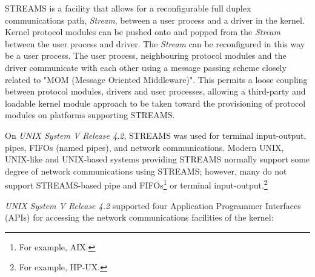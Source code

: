 \documentclass[letterpaper,final,notitlepage,twocolumn,10pt,twoside]{article}
\begin{document}
STREAMS is a facility that allows for a reconfigurable full duplex
communications path, \textit{Stream}, between a user process and a driver in
the kernel.   Kernel protocol modules can be pushed onto and popped from the
\textit{Stream} between the user process and driver.  The \textit{Stream} can
be reconfigured in this way be a user process.  The user process, neighbouring
protocol modules and the driver communicate with each other using a message
passing scheme closely related to "MOM (Message Oriented Middleware)".  This
permits a loose coupling between protocol modules, drivers and user processes,
allowing a third-party and loadable kernel module approach to be taken toward
the provisioning of protocol modules on platforms supporting STREAMS.

On \textsl{UNIX System V Release 4.2}, STREAMS was used for terminal
input-output, pipes, FIFOs (named pipes), and network communications.  Modern
UNIX, UNIX-like and UNIX-based systems providing STREAMS normally support some
degree of network communications using STREAMS; however, many do not support
STREAMS-based pipe and FIFOs\footnote{For example, AIX.} or terminal
input-output.\footnote{For example, HP-UX.}

\textsl{UNIX System V Release 4.2} supported four Application Programmer
Interfaces (APIs) for accessing the network communications facilities of the
kernel:
\end{document}
